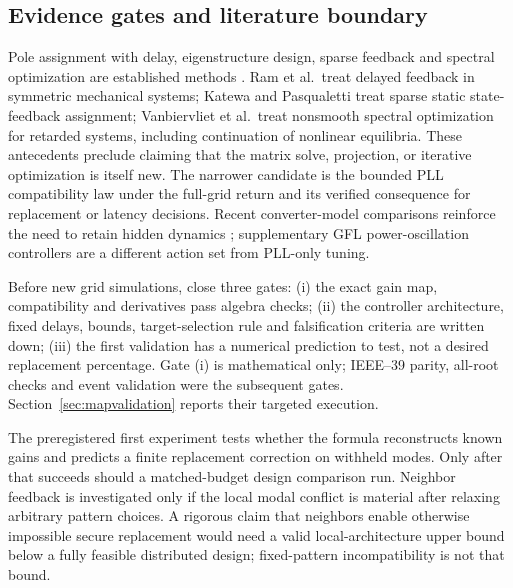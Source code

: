 \documentclass[11pt]{article}
\begin{document}
\subsection{Evidence gates and literature boundary}
Pole assignment with delay, eigenstructure design, sparse feedback and
spectral optimization are established methods
\cite{ram,katewa,vanbiervliet,mao}.
Ram et al.\ treat delayed feedback in symmetric mechanical systems;
Katewa and Pasqualetti treat sparse static state-feedback assignment;
Vanbiervliet et al.\ treat nonsmooth spectral optimization for retarded
systems, including continuation of nonlinear equilibria.
These antecedents preclude claiming that the matrix solve, projection,
or iterative optimization is itself new. The narrower candidate is
the bounded PLL compatibility law under the full-grid return and its
verified consequence for replacement or latency decisions.
Recent converter-model comparisons reinforce the need to retain
hidden dynamics \cite{coffey}; supplementary GFL power-oscillation
controllers \cite{chakraborty} are a different action set from PLL-only tuning.

Before new grid simulations, close three gates:
(i) the exact gain map, compatibility and derivatives pass algebra checks;
(ii) the controller architecture, fixed delays, bounds, target-selection
rule and falsification criteria are written down;
(iii) the first validation has a numerical prediction to test, not a
desired replacement percentage. Gate (i) is mathematical only; IEEE--39
parity, all-root checks and event validation were the subsequent gates.
Section~\ref{sec:mapvalidation} reports their targeted execution.

The preregistered first experiment tests whether the formula reconstructs known
gains and predicts a finite replacement correction on withheld modes.
Only after that succeeds should a matched-budget design comparison run.
Neighbor feedback is investigated only if the local modal conflict is
material after relaxing arbitrary pattern choices. A rigorous claim
that neighbors enable otherwise impossible secure replacement would
need a valid local-architecture upper bound below a fully feasible
distributed design; fixed-pattern incompatibility is not that bound.
\end{document}
